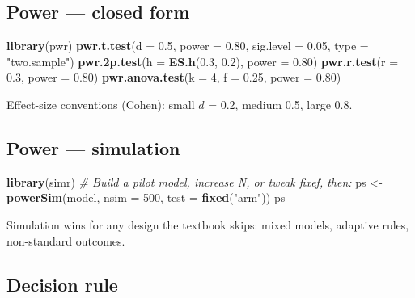 \documentclass[
]{article}
\newenvironment{Shaded}{\begin{snugshade}}{\end{snugshade}}
\newcommand{\AttributeTok}[1]{\textcolor[rgb]{0.13,0.29,0.53}{#1}}
\newcommand{\CommentTok}[1]{\textcolor[rgb]{0.56,0.35,0.01}{\textit{#1}}}
\newcommand{\DecValTok}[1]{\textcolor[rgb]{0.00,0.00,0.81}{#1}}
\newcommand{\FloatTok}[1]{\textcolor[rgb]{0.00,0.00,0.81}{#1}}
\newcommand{\FunctionTok}[1]{\textcolor[rgb]{0.13,0.29,0.53}{\textbf{#1}}}
\newcommand{\NormalTok}[1]{#1}
\newcommand{\OtherTok}[1]{\textcolor[rgb]{0.56,0.35,0.01}{#1}}
\newcommand{\StringTok}[1]{\textcolor[rgb]{0.31,0.60,0.02}{#1}}
\begin{document}
\subsection{Power --- closed form}\label{power-closed-form}

\begin{Shaded}
\begin{Highlighting}[]
\FunctionTok{library}\NormalTok{(pwr)}
\FunctionTok{pwr.t.test}\NormalTok{(}\AttributeTok{d =} \FloatTok{0.5}\NormalTok{, }\AttributeTok{power =} \FloatTok{0.80}\NormalTok{, }\AttributeTok{sig.level =} \FloatTok{0.05}\NormalTok{,}
           \AttributeTok{type =} \StringTok{"two.sample"}\NormalTok{)}
\FunctionTok{pwr.2p.test}\NormalTok{(}\AttributeTok{h =} \FunctionTok{ES.h}\NormalTok{(}\FloatTok{0.3}\NormalTok{, }\FloatTok{0.2}\NormalTok{), }\AttributeTok{power =} \FloatTok{0.80}\NormalTok{)}
\FunctionTok{pwr.r.test}\NormalTok{(}\AttributeTok{r =} \FloatTok{0.3}\NormalTok{, }\AttributeTok{power =} \FloatTok{0.80}\NormalTok{)}
\FunctionTok{pwr.anova.test}\NormalTok{(}\AttributeTok{k =} \DecValTok{4}\NormalTok{, }\AttributeTok{f =} \FloatTok{0.25}\NormalTok{, }\AttributeTok{power =} \FloatTok{0.80}\NormalTok{)}
\end{Highlighting}
\end{Shaded}

Effect-size conventions (Cohen): small \(d\) = 0.2, medium 0.5, large
0.8.

\subsection{Power --- simulation}\label{power-simulation}

\begin{Shaded}
\begin{Highlighting}[]
\FunctionTok{library}\NormalTok{(simr)}
\CommentTok{\# Build a pilot model, increase N, or tweak fixef, then:}
\NormalTok{ps }\OtherTok{\textless{}{-}} \FunctionTok{powerSim}\NormalTok{(model, }\AttributeTok{nsim =} \DecValTok{500}\NormalTok{, }\AttributeTok{test =} \FunctionTok{fixed}\NormalTok{(}\StringTok{"arm"}\NormalTok{))}
\NormalTok{ps}
\end{Highlighting}
\end{Shaded}

Simulation wins for any design the textbook skips: mixed models,
adaptive rules, non-standard outcomes.

\subsection{Decision rule}\label{decision-rule-8}
\end{document}
